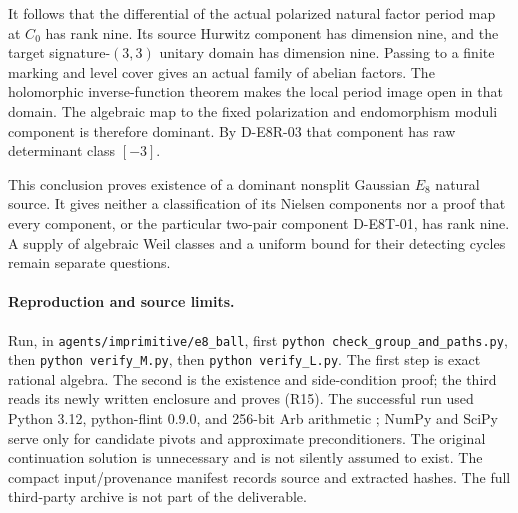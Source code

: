 It follows that the differential of the actual polarized natural
factor period map at $C_0$ has rank nine. Its source Hurwitz
component has dimension nine, and the target signature-$(3,3)$
unitary domain has dimension nine. Passing to a finite marking and
level cover gives an actual family of abelian factors. The holomorphic
inverse-function theorem makes the local period image open in that
domain. The algebraic map to the fixed polarization and endomorphism
moduli component is therefore dominant. By D-E8R-03 that component
has raw determinant class $[-3]$.

This conclusion proves existence of a dominant nonsplit Gaussian
$E_8$ natural source. It gives neither a classification of its
Nielsen components nor a proof that every component, or the
particular two-pair component D-E8T-01, has rank nine. A supply of
algebraic Weil classes and a uniform bound for their detecting
cycles remain separate questions.

\paragraph{Reproduction and source limits.}
Run, in \texttt{agents/imprimitive/e8\_ball}, first
\texttt{python check\_group\_and\_paths.py}, then
\texttt{python verify\_M.py}, then \texttt{python verify\_L.py}.
The first step is exact rational algebra. The second is the
existence and side-condition proof; the third reads its newly
written enclosure and proves (R15). The successful run used
Python 3.12, python-flint 0.9.0, and 256-bit Arb arithmetic
\cite{IM:JohanssonArb}; NumPy and SciPy serve only for candidate
pivots and approximate preconditioners. The original continuation
solution is unnecessary and is not silently assumed to exist.
The compact input/provenance manifest records source and extracted
hashes. The full third-party archive is not part of the deliverable.
